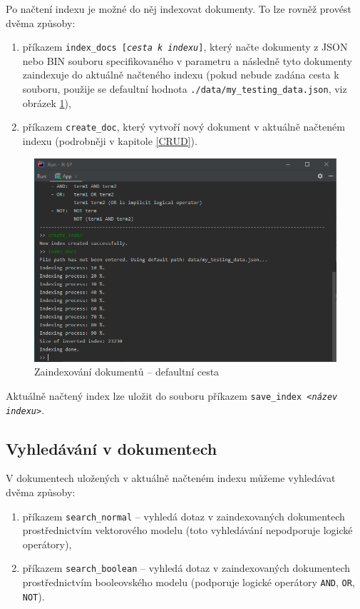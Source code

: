 \documentclass[
11pt,
a4paper,
pdftex,
czech,
titlepage
]{report}
\begin{document}
Po načtení indexu je možné do něj indexovat dokumenty. To lze rovněž provést dvěma způsoby:

\begin{enumerate}
    \item příkazem \texttt{index\_docs [\textit{cesta k indexu}]}, který načte dokumenty z JSON nebo BIN souboru specifikovaného v parametru a následně tyto dokumenty zaindexuje do aktuálně načteného indexu (pokud nebude zadána cesta k souboru, použije se defaultní hodnota \texttt{./data/my\_testing\_data.json}, viz obrázek \ref{uziv_zaindexovani}),
    \item příkazem \texttt{create\_doc}, který vytvoří nový dokument v aktuálně načteném indexu (podrobněji v kapitole \ref{CRUD}).
\end{enumerate}

\begin{figure}[!ht]
	\centering
	\includegraphics[width=1\textwidth]{img/zaindexovani.png}
	\caption{Zaindexování dokumentů -- defaultní cesta}
	\label{uziv_zaindexovani}
\end{figure}

Aktuálně načtený index lze uložit do souboru příkazem \texttt{save\_index <\textit{název indexu}>}.

\subsection{Vyhledávání v dokumentech}
V dokumentech uložených v aktuálně načteném indexu můžeme vyhledávat dvěma způsoby: 

\begin{enumerate}
    \item příkazem \texttt{search\_normal} -- vyhledá dotaz v zaindexovaných dokumentech prostřednictvím vektorového modelu (toto vyhledávání nepodporuje logické operátory),
    \item příkazem \texttt{search\_boolean} -- vyhledá dotaz v zaindexovaných dokumentech prostřednictvím booleovského modelu (podporuje logické operátory \texttt{AND}, \texttt{OR}, \texttt{NOT}).
\end{enumerate}
\end{document}
